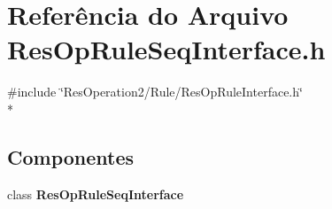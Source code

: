 \section{Referência do Arquivo Res\+Op\+Rule\+Seq\+Interface.\+h}
\label{_res_op_rule_seq_interface_8h}
{\ttfamily \#include \char`\"{}Res\+Operation2/\+Rule/\+Res\+Op\+Rule\+Interface.\+h\char`\"{}}\\*
\subsection*{Componentes}
\begin{DoxyCompactItemize}
\item 
class {\bf Res\+Op\+Rule\+Seq\+Interface}
\end{DoxyCompactItemize}
